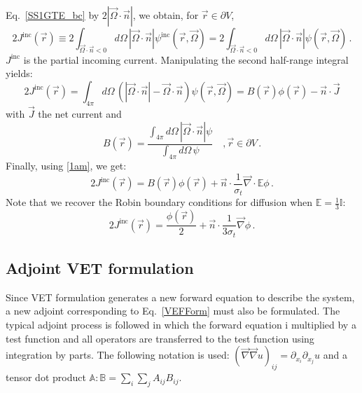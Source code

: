 \documentclass[12pt]{report}
\newcommand{\vr}{\vec{r}}
\newcommand{\vJ}{\vec{J}}
\newcommand{\vO}{\vec{\Omega}}
\renewcommand{\div}{\vec{\nabla} \cdot}
\newcommand{\grad}{\vec{\nabla}}
\newcommand{\bound}{\partial V}
\newcommand{\vn}{\vec{n}}
\newcommand{\Edd}{\mathbb{E}}
\newcommand{\BEdd}{B}
\newcommand{\sigt}{\sigma_t}
\begin{document}
Eq.~\eqref{SS1GTE_bc} by $2 | \vO \cdot \vn |$, we obtain, for $\vr \in \bound$,
\begin{equation}
2 J^{\text{inc}}(\vr) \equiv  2 \int_{\vO \cdot \vn <0 }  d \Omega\, | \vO \cdot \vec{n} | \psi^{\text{inc}}(\vr,\vO) 
= 2\int_{\vO \cdot \vn <0 } d \Omega\,  | \vO \cdot \vn |  \psi(\vr,\vO) \,.
\end{equation}
$J^{\text{inc}}$ is the partial incoming current. 
Manipulating the second half-range integral yields:
\begin{equation}
2 J^{\text{inc}}(\vr) = \int_{4\pi} d \Omega\,  \left( | \vO \cdot \vn |- \vO\cdot\vn\right)  \psi(\vr,\vO) 
= \BEdd(\vr) \phi(\vr) - \vn \cdot \vJ 
\end{equation}
with $\vJ$ the net current and
\begin{equation}
\BEdd(\vr) = \frac{\int_{4 \pi} d\Omega \, | \vO \cdot \vn | \psi}{\int_{4\pi} d\Omega \, \psi} \quad , \vr \in \bound \,.
\end{equation}
Finally, using \eqref{1am}, we get:
\begin{equation}
2 J^{\text{inc}}(\vr) = \BEdd(\vr) \phi(\vr) + \vn \cdot \frac{1}{\sigt} \div \Edd \phi \,.
\end{equation}
Note that we recover the Robin boundary conditions for diffusion when $\Edd = \tfrac{1}{3} \mathbb{I}$:
\[
2 J^{\text{inc}}(\vr) = \frac{\phi(\vr)}{2} + \vn \cdot \frac{1}{3\sigt} \grad \phi \,.
\]


\subsection{Adjoint VET formulation}

Since VET formulation generates a new forward equation to describe the system, a new adjoint corresponding to Eq.~\eqref{VEFForm} must also be formulated. The typical adjoint process is followed in which the forward equation i multiplied by a test function and all operators are transferred to the test function using integration by parts. The following notation is used: $(\grad \grad u)_{ij} = \partial_{x_i} \partial_{x_j} u$
and a tensor dot product $\mathbb{A} : \mathbb{B} = \sum_i \sum_j A_{ij}B_{ij}$.
\end{document}
